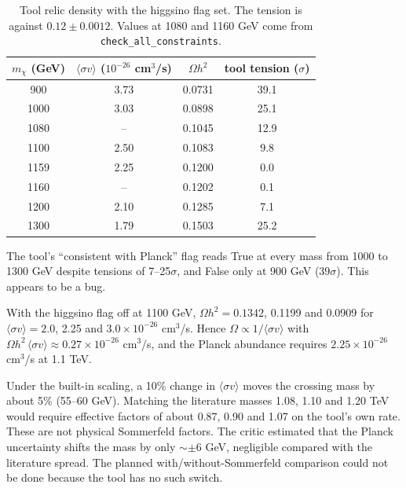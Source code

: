 \documentclass[11pt,a4paper]{article}
\begin{document}
\begin{table}[h]
\centering
\begin{tabular}{cccc}
\toprule
$m_\chi$ (GeV) & $\langle\sigma v\rangle$ ($10^{-26}$ cm$^3$/s) & $\Omega h^2$ & tool tension ($\sigma$) \\
\midrule
900 & 3.73 & 0.0731 & 39.1 \\
1000 & 3.03 & 0.0898 & 25.1 \\
1080 & -- & 0.1045 & 12.9 \\
1100 & 2.50 & 0.1083 & 9.8 \\
1159 & 2.25 & 0.1200 & 0.0 \\
1160 & -- & 0.1202 & 0.1 \\
1200 & 2.10 & 0.1285 & 7.1 \\
1300 & 1.79 & 0.1503 & 25.2 \\
\bottomrule
\end{tabular}
\caption{Tool relic density with the higgsino flag set. The tension is against $0.12\pm0.0012$. Values at 1080 and 1160 GeV come from \texttt{check\_all\_constraints}.}
\label{tab:relic}
\end{table}

The tool's ``consistent with Planck'' flag reads True at every mass from 1000 to 1300 GeV despite tensions of 7--25$\sigma$, and False only at 900 GeV ($39\sigma$). This appears to be a bug.

With the higgsino flag off at 1100 GeV, $\Omega h^2 = 0.1342$, 0.1199 and 0.0909 for $\langle\sigma v\rangle = 2.0$, 2.25 and $3.0\times10^{-26}$ cm$^3$/s. Hence $\Omega\propto1/\langle\sigma v\rangle$ with $\Omega h^2\,\langle\sigma v\rangle\approx0.27\times10^{-26}$ cm$^3$/s, and the Planck abundance requires $2.25\times10^{-26}$ cm$^3$/s at 1.1 TeV.

Under the built-in scaling, a 10\% change in $\langle\sigma v\rangle$ moves the crossing mass by about 5\% (55--60 GeV). Matching the literature masses 1.08, 1.10 and 1.20 TeV would require effective factors of about 0.87, 0.90 and 1.07 on the tool's own rate. These are not physical Sommerfeld factors. The critic estimated that the Planck uncertainty shifts the mass by only $\sim\pm6$ GeV, negligible compared with the literature spread. The planned with/without-Sommerfeld comparison could not be done because the tool has no such switch.
\end{document}
